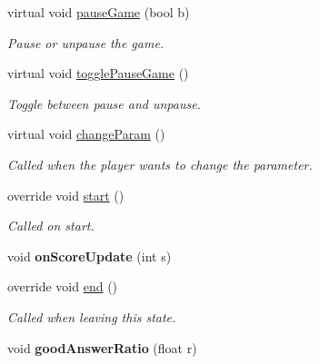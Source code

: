 \begin{DoxyCompactItemize}
virtual void \hyperlink{class_game_state_a36e34651a05cd9abe442fa8c3f372f6f}{pause\-Game} (bool b)
\begin{DoxyCompactList}\small\item\em Pause or unpause the game.\end{DoxyCompactList}\item 
virtual void \hyperlink{class_game_state_a699c7b8e64c3dd7956c7247c8b410d26}{toggle\-Pause\-Game} ()
\begin{DoxyCompactList}\small\item\em Toggle between pause and unpause.\end{DoxyCompactList}\item 
virtual void \hyperlink{class_game_state_a4a2c8854f43da06b04ca4681cf69a2fb}{change\-Param} ()
\begin{DoxyCompactList}\small\item\em Called when the player wants to change the parameter.\end{DoxyCompactList}\item 
override void \hyperlink{class_game_state_ab3f0f0322d48250cb81325a08b8110c0}{start} ()
\begin{DoxyCompactList}\small\item\em Called on start.\end{DoxyCompactList}\item 
\hypertarget{class_game_state_a77d87aefceace9c569b75b445ef4b50d}{void {\bfseries on\-Score\-Update} (int s)}\label{class_game_state_a77d87aefceace9c569b75b445ef4b50d}

\item 
override void \hyperlink{class_game_state_a78fd33460f64d49851bbfbb183547e83}{end} ()
\begin{DoxyCompactList}\small\item\em Called when leaving this state.\end{DoxyCompactList}\item 
\hypertarget{class_game_state_a2dcd5df80a5046e6016ce219cbc3e19c}{void {\bfseries good\-Answer\-Ratio} (float r)}\label{class_game_state_a2dcd5df80a5046e6016ce219cbc3e19c}


\end{DoxyCompactItemize}
